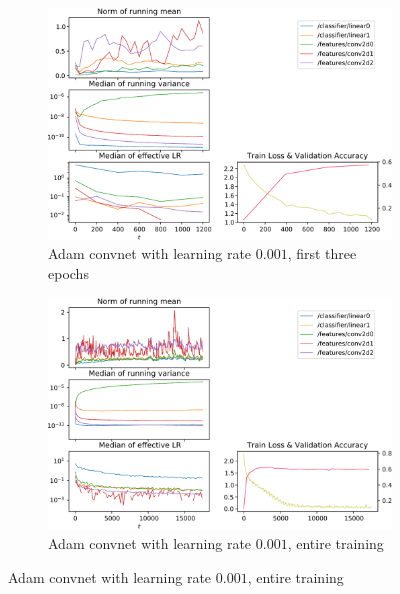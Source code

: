 \begin{figure}
    \begin{subfigure}{\textwidth}
        \centering
        \includegraphics[width=\linewidth]{gfx/diagrams/experiments/adam/adammodel_adam_0001_0_1200.pdf}
        \caption{Adam convnet with learning rate $0.001$, first three epochs}
        \label{fig:adam-repro-1}
    \end{subfigure}

    \begin{subfigure}{\textwidth}
        \centering
        \includegraphics[width=\linewidth]{gfx/diagrams/experiments/adam/adammodel_adam_0001_0_-1.pdf}
        \caption{Adam convnet with learning rate $0.001$, entire training}
        \label{fig:adam-repro-2}
    \end{subfigure}
    \label{fig:adam-repro}
\end{figure}

